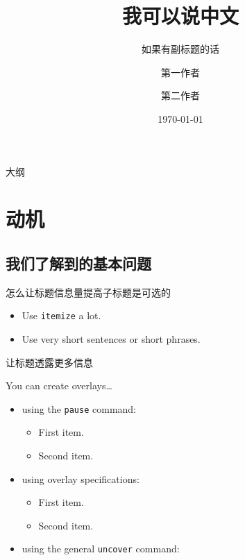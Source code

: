 \documentclass{beamer}
\title[我可以说中文我可以说中文我可以说中文我可以] %
{我可以说中文}
\subtitle
{如果有副标题的话}
\author[宣读作者] %
{第一作者 \and 第二作者}
\institute[商学院] %
{宁波大学商学院}
\date[2013年学术大会] %
{\today}
\begin{document}
\begin{frame}[plain]
  \titlepage
\end{frame}

\begin{frame}{大纲}
  \tableofcontents
\end{frame}

\section{动机}

\subsection{我们了解到的基本问题}

\begin{frame}{怎么让标题信息量提高}{子标题是可选的}
  \begin{itemize}
  \item
    Use \texttt{itemize} a lot.
  \item
    Use very short sentences or short phrases.
  \end{itemize}
\end{frame}

\begin{frame}{让标题透露更多信息}

  You can create overlays\dots
  \begin{itemize}
  \item using the \texttt{pause} command:
    \begin{itemize}
    \item
      First item.
      \pause
    \item
      Second item.
    \end{itemize}
  \item
    using overlay specifications:
    \begin{itemize}
    \item<3->
      First item.
    \item<4->
      Second item.
    \end{itemize}
  \item
    using the general \texttt{uncover} command:
    \begin{itemize}
    \end{itemize}
  \end{itemize}
\end{frame}
\end{document}
